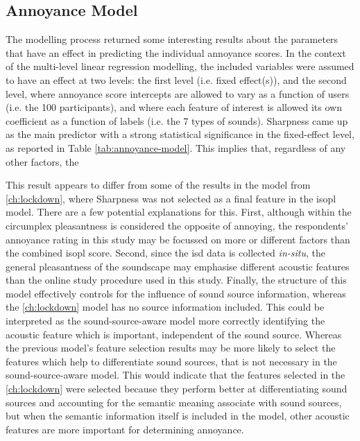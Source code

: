 \subsection{Annoyance Model}
The modelling process returned some interesting results about the parameters that have an effect in predicting the individual annoyance scores. In the context of the multi-level linear regression modelling, the included variables were assumed to have an effect at two levels: the first level (i.e. fixed effect(s)), and the second level, where annoyance score intercepts are allowed to vary as a function of users (i.e. the 100 participants), and where each feature of interest is allowed its own coefficient as a function of labels (i.e. the 7 types of sounds). Sharpness came up as the main predictor with a strong statistical significance in the fixed-effect level, as reported in Table \ref{tab:annoyance-model}. This implies that, regardless of any other factors, the 

This result appears to differ from some of the results in the model from \cref{ch:lockdown}, where Sharpness was not selected as a final feature in the \gls{isopl} model. There are a few potential explanations for this. First, although within the circumplex pleasantness is considered the opposite of annoying, the respondents' annoyance rating in this study may be focussed on more or different factors than the combined \gls{isopl} score. Second, since the \gls{isd} data is collected \emph{in-situ}, the general pleasantness of the soundscape may emphasise different acoustic features than the online study procedure used in this study. Finally, the structure of this model effectively controls for the influence of sound source information, whereas the \cref{ch:lockdown} model has no source information included. This could be interpreted as the sound-source-aware model more correctly identifying the acoustic feature which is important, independent of the sound source. Whereas the previous model's feature selection results may be more likely to select the features which help to differentiate sound sources, that is not necessary in the sound-source-aware model. This would indicate that the features selected in the \cref{ch:lockdown} were selected because they perform better at differentiating sound sources and accounting for the semantic meaning associate with sound sources, but when the semantic information itself is included in the model, other acoustic features are more important for determining annoyance. 

